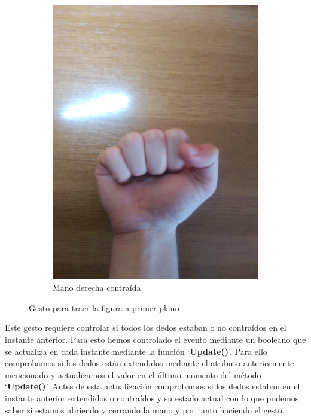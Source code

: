 \documentclass[a4paper,11pt]{article}
\begin{document}
\begin{figure}[!h]
\begin{subfigure}{0.48\textwidth}
		\includegraphics[scale=0.066]{./Imagenes/trae_da_vinci2.jpg}
		\caption{Mano derecha contraída}
	\end{subfigure}
	\caption{Gesto para traer la figura a primer plano}
	\label{gesto1}
\end{figure}

Este gesto requiere controlar si todos los dedos estaban o no contraídos en el instante anterior. Para esto hemos controlado el evento mediante un booleano que se actualiza en cada instante mediante la función `\textbf{Update()}'. Para ello comprobamos si los dedos están extendidos mediante el atributo anteriormente mencionado y actualizamos el valor en el último momento del método `\textbf{Update()}'. Antes de esta actualización comprobamos si los dedos estaban en el instante anterior extendidos o contraídos y su estado actual con lo que podemos saber si estamos abriendo y cerrando la mano y por tanto haciendo el gesto.
\end{document}
